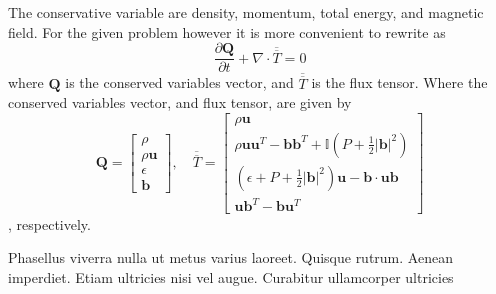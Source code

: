\documentclass[paper=a4, fontsize=11pt]{scrartcl}
\newcommand*{\rttensor}[1]{\overline{\overline{#1}}}
\newcommand{\pfrac}[2]{\frac{\partial#1}{\partial#2}}
\numberwithin{equation}{section}                %
\numberwithin{figure}{section}                  %
\numberwithin{table}{section}                           %
\begin{document}
The conservative variable are density, momentum, total energy, and magnetic field. For the given problem however it is more convenient to rewrite as
\begin{equation}\label{eqn:mhdvector}
  \pfrac{\mathbf{Q}}{t} + \nabla \cdot \rttensor{T} = 0
\end{equation}
where $\mathbf{Q}$ is the conserved variables vector, and $\rttensor{T}$ is the flux tensor. Where the conserved variables vector, and flux tensor, are given by
\[
  \mathbf{Q}=
  \begin{bmatrix}
    \rho  \\
    \rho \mathbf{u}  \\
    \epsilon\\
    \mathbf{b} 
  \end{bmatrix}
  ,\quad \rttensor{T} =
  \begin{bmatrix}
    \rho \mathbf{u}  \\
    \rho \mathbf{u}\mathbf{u}^T - \mathbf{b}\mathbf{b}^T + \mathbb{I}\left(P + \frac{1}{2}|\mathbf{b}|^2\right)\\
    \left(\epsilon + P + \frac{1}{2}|\mathbf{b}|^2\right)\mathbf{u}- \mathbf{b}\cdot\mathbf{u}\mathbf{b}\\
    \mathbf{u}\mathbf{b}^T-\mathbf{b}\mathbf{u}^T
  \end{bmatrix}
\]
, respectively. 
  
  Phasellus viverra nulla ut metus varius laoreet. Quisque rutrum. Aenean imperdiet. Etiam ultricies nisi vel augue. Curabitur ullamcorper ultricies 
\end{document}
